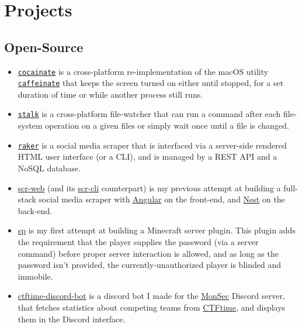 \documentclass[a4paper, 10pt]{article}
\begin{document}
	\section{Projects}
	\subsection{Open-Source}
	\begin{itemize}
		\item \href{https://github.com/AppleGamer22/cocainate}{\texttt{cocainate}} is a cross-platform re-implementation of the macOS utility \href{https://github.com/apple-oss-distributions/PowerManagement/tree/main/caffeinate}{\texttt{caffeinate}} that keeps the screen turned on either until stopped, for a set duration of time or while another process still runs.
		\item \href{https://github.com/AppleGamer22/stalk}{\texttt{stalk}} is a cross-platform file-watcher that can run a command after each file-system operation on a given files or simply wait once until a file is changed.
		\item \href{https://github.com/AppleGamer22/raker}{\texttt{raker}} is a social media scraper that is interfaced via a server-side rendered HTML user interface (or a CLI), and is managed by a REST API and a NoSQL database.
		\item \href{https://github.com/AppleGamer22/scr-web}{scr-web} (and its \href{https://github.com/AppleGamer22/scr-cli}{scr-cli} counterpart) is my previous attempt at building a full-stack social media scraper with \href{https://angular.io}{Angular} on the front-end, and \href{https://nestjs.com}{Nest} on the back-end.
		\item \href{https://github.com/AppleGamer22/sp}{sp} is my first attempt at building a Minecraft server plugin. This plugin adds the requirement that the player supplies the password (via a server command) before proper server interaction is allowed, and as long as the password isn't provided, the currently-unauthorized player is blinded and immobile.
		\item \href{https://github.com/monsec/ctftime-discord-bot}{ctftime-discord-bot} is a discord bot I made for the \href{https://monsec.io}{MonSec} Discord server, that fetches statistics about competing teams from \href{https://ctftime.org}{CTFtime}, and displays them in the Discord interface.
	\end{itemize}
\end{document}
